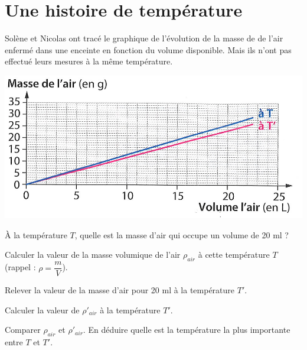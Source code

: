 \section{Une histoire de température}

Solène et Nicolas ont tracé le graphique de l'évolution de la masse de de l'air enfermé dans une enceinte en fonction du volume disponible. Mais ils n'ont pas effectué leurs mesures à la même température.

\begin{center}
	\includegraphics[scale=0.5]{masse}
\end{center}

\begin{questions}
	\question \`A la température $T$, quelle est la masse d'air qui occupe un volume de 20 ml ?
	\fillwithdottedlines{2cm}
	
	\question Calculer la valeur de la masse volumique de l'air $\rho_{air} $ à cette température $T$ (rappel : $\rho = \dfrac{m}{V}$).
	\fillwithdottedlines{3cm}
	
	\question Relever la valeur de la masse d'air pour 20 ml  à la température $T'$.
	
	\fillwithdottedlines{2cm}
	
	\question Calculer la valeur de $\rho '_{air} $ à la température $T'$.
	
	\fillwithdottedlines{3cm}
	
	
	\newpage
	
	\question Comparer $\rho_{air}$ et $\rho'_{air}$. En déduire quelle est la température la plus importante entre $T$ et $T'$.
	
	\fillwithdottedlines{4cm}
	
	
\end{questions}

